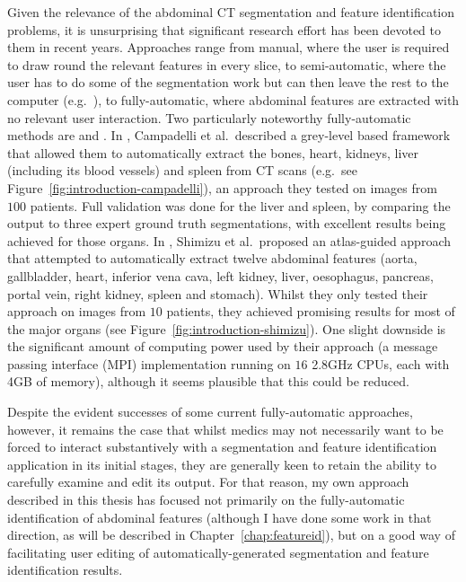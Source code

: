 Given the relevance of the abdominal CT segmentation and feature identification problems, it is unsurprising that significant research effort has been devoted to them in recent years. Approaches range from manual, where the user is required to draw round the relevant features in every slice, to semi-automatic, where the user has to do some of the segmentation work but can then leave the rest to the computer (e.g.~\cite{loncaric00}), to fully-automatic, where abdominal features are extracted with no relevant user interaction. Two particularly noteworthy fully-automatic methods are \cite{campadelli09} and \cite{shimizu07}. In \cite{campadelli09}, Campadelli et al.\ described a grey-level based framework that allowed them to automatically extract the bones, heart, kidneys, liver (including its blood vessels) and spleen from CT scans (e.g.~see Figure~\ref{fig:introduction-campadelli}), an approach they tested on images from $100$ patients. Full validation was done for the liver and spleen, by comparing the output to three expert ground truth segmentations, with excellent results being achieved for those organs. In \cite{shimizu07}, Shimizu et al.\ proposed an atlas-guided approach that attempted to automatically extract twelve abdominal features (aorta, gallbladder, heart, inferior vena cava, left kidney, liver, oesophagus, pancreas, portal vein, right kidney, spleen and stomach). Whilst they only tested their approach on images from $10$ patients, they achieved promising results for most of the major organs (see Figure~\ref{fig:introduction-shimizu}). One slight downside is the significant amount of computing power used by their approach (a message passing interface (MPI) implementation running on $16$ 2.8GHz CPUs, each with 4GB of memory), although it seems plausible that this could be reduced.


Despite the evident successes of some current fully-automatic approaches, however, it remains the case that whilst medics may not necessarily want to be forced to interact substantively with a segmentation and feature identification application in its initial stages, they are generally keen to retain the ability to carefully examine and edit its output. For that reason, my own approach described in this thesis has focused not primarily on the fully-automatic identification of abdominal features (although I have done some work in that direction, as will be described in Chapter~\ref{chap:featureid}), but on a good way of facilitating user editing of automatically-generated segmentation and feature identification results.

